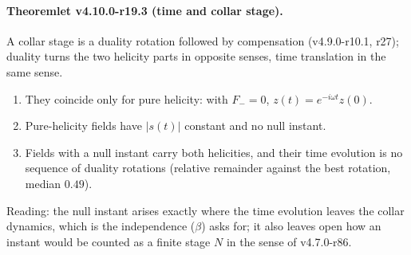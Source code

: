\paragraph{Theoremlet v4.10.0-r19.3 (time and collar stage).}
A collar stage is a duality rotation followed by compensation (v4.9.0-r10.1, r27); duality turns the two helicity parts in
opposite senses, time translation in the same sense.
\begin{enumerate}[leftmargin=2em]
\item[(a)] They coincide only for pure helicity: with \(F_-=0\), \(z(t)=e^{-i\omega t}z(0)\).
\item[(b)] Pure-helicity fields have \(|s(t)|\) constant and no null instant.
\item[(c)] Fields with a null instant carry both helicities, and their time evolution is no sequence of duality rotations (relative
remainder against the best rotation, median \(0.49\)).
\end{enumerate}
Reading: the null instant arises exactly where the time evolution leaves the collar dynamics, which is the independence (\(\beta\))
asks for; it also leaves open how an instant would be counted as a finite stage \(N\) in the sense of v4.7.0-r86.


